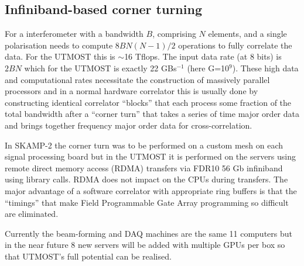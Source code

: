 \subsection{Infiniband-based corner turning}
For a interferometer with a bandwidth $B$, comprising $N$ elements, and a single polarisation needs to compute $8BN(N-1)/2$ operations to fully correlate the data. For the UTMOST this is $\sim$16 Tflops. The input data rate (at 8 bits) is $2BN$ which for the UTMOST is exactly 22 GBs$^{-1}$ (here G=10$^9$). These high data and computational rates necessitate the construction of massively parallel processors and in a normal hardware correlator this is usually done by constructing identical correlator ``blocks'' that each process some fraction of the total bandwidth after a ``corner turn'' that takes a series of time major order data and brings together frequency major order data for cross-correlation.

In SKAMP-2 the corner turn was to be performed on a custom mesh on each signal processing board but in the UTMOST it is performed on the servers using remote direct memory access (RDMA) transfers via FDR10 56 Gb infiniband using library calls. RDMA does not impact on the CPUs during transfers. The major advantage of a software correlator with appropriate ring buffers is that the ``timings'' that make Field Programmable Gate Array programming so difficult are eliminated.

Currently the beam-forming and DAQ machines are the same 11 computers but in the near future 8 new servers will be added with multiple GPUs per box so that UTMOST's full potential can be realised.

